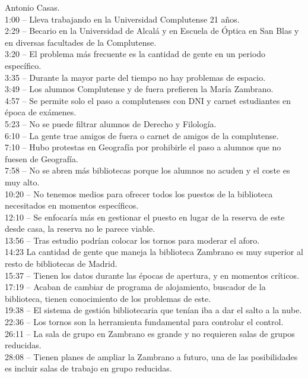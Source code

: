 \documentclass[12pt]{article}
\begin{document}
Antonio Casas.\\
1:00 – Lleva trabajando en la Universidad Complutense 21 años.\\
2:29 – Becario en la Universidad de Alcalá y en Escuela de Óptica en San Blas y en diversas facultades de la Complutense.\\
3:20 – El problema más frecuente es la cantidad de gente en un periodo específico.\\
3:35 – Durante la mayor parte del tiempo no hay problemas de espacio.\\
3:49 – Los alumnos Complutense y de fuera prefieren la María Zambrano.\\
4:57 – Se permite solo el paso a complutenses con DNI y carnet estudiantes en época de exámenes.\\
5:23 – No se puede filtrar alumnos de Derecho y Filología.\\
6:10 – La gente trae amigos de fuera o carnet de amigos de la complutense.\\
7:10 – Hubo protestas en Geografía por prohibirle el paso a alumnos que no fuesen de Geografía.\\
7:58 – No se abren más bibliotecas porque los alumnos no acuden y el coste es muy alto.\\
10:20 – No tenemos medios para ofrecer todos los puestos de la biblioteca necesitados en momentos específicos.\\
12:10 – Se enfocaría más en gestionar el puesto en lugar de la reserva de este desde casa, la reserva no le parece viable.\\
13:56 – Tras estudio podrían colocar los tornos para moderar el aforo.\\
14:23 La cantidad de gente que maneja la biblioteca Zambrano es muy superior al resto de bibliotecas de Madrid.\\
15:37 – Tienen los datos durante las épocas de apertura, y en momentos críticos.\\
17:19 – Acaban de cambiar de programa de alojamiento, buscador de la biblioteca, tienen conocimiento de los problemas de este.\\
19:38 – El sistema de gestión bibliotecaria que tenían iba a dar el salto a la nube.\\
22:36 – Los tornos son la herramienta fundamental para controlar el control.\\
26:11 – La sala de grupo en Zambrano es grande y no requieren salas de grupos reducidas.\\
28:08 – Tienen planes de ampliar la Zambrano a futuro, una de las posibilidades es incluir salas de trabajo en grupo reducidas.\\
\end{document}
